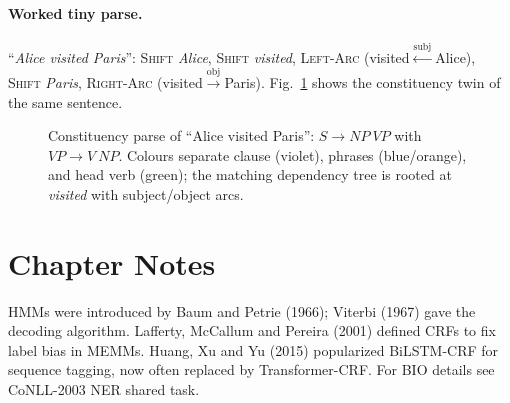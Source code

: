 \paragraph{Worked tiny parse.} ``\emph{Alice visited Paris}'': \textsc{Shift} \emph{Alice}, \textsc{Shift} \emph{visited}, \textsc{Left-Arc} (visited$\xleftarrow{\mathrm{subj}}$Alice), \textsc{Shift} \emph{Paris}, \textsc{Right-Arc} (visited$\xrightarrow{\mathrm{obj}}$Paris). Fig.~\ref{fig:parse-tree} shows the constituency twin of the same sentence.
\begin{figure}[h]
\centering
{}
\caption{Constituency parse of ``Alice visited Paris'': $S\to NP~VP$ with $VP\to V~NP$. Colours separate clause (violet), phrases (blue/orange), and head verb (green); the matching dependency tree is rooted at \emph{visited} with subject/object arcs.}
\label{fig:parse-tree}
\end{figure}

\section{Chapter Notes}
HMMs were introduced by Baum and Petrie (1966); Viterbi (1967) gave the decoding algorithm. Lafferty, McCallum and Pereira (2001) defined CRFs to fix label bias in MEMMs. Huang, Xu and Yu (2015) popularized BiLSTM-CRF for sequence tagging, now often replaced by Transformer-CRF. For BIO details see CoNLL-2003 NER shared task.

